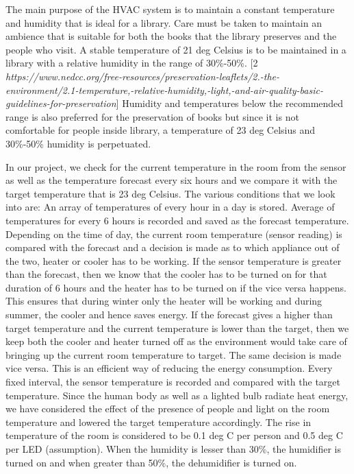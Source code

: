 \documentclass[runningheads]{llncs}
\begin{document}
The main purpose of the HVAC system is to maintain a constant temperature and humidity that is ideal for a library. Care must be taken to maintain an ambience that is suitable for both the books that the library preserves and the people who visit.
A stable temperature of 21 deg Celsius is to be maintained in a library with a relative humidity in the range of 30\%-50\%. [2 \textit{https://www.nedcc.org/free-resources/preservation-leaflets/2.-the-environment/2.1-temperature,-relative-humidity,-light,-and-air-quality-basic-guidelines-for-preservation}] Humidity and temperatures below the recommended range is also preferred for the preservation of books but since it is not comfortable for people inside library, a temperature of 23 deg Celsius and 30\%-50\% humidity is perpetuated.
\vspace{2mm}
\par In our project, we check for the current temperature in the room from the sensor as well as the temperature forecast every six hours and we compare it with the target temperature that is 23 deg Celsius. The various conditions that we look into are:
An array of temperatures of every hour in a day is stored. Average of temperatures for every 6 hours is recorded and saved as the forecast temperature. Depending on the time of day, the current room temperature (sensor reading) is compared with the forecast and a decision is made as to which appliance out of the two, heater or cooler has to be working. If the sensor temperature is greater than the forecast, then we know that the cooler has to be turned on for that duration of 6 hours and the heater has to be turned on if the vice versa happens. This ensures that during winter only the heater will be working and during summer, the cooler and hence saves energy. If the forecast gives a higher than target temperature and the current temperature is lower than the target, then we keep both the cooler and heater turned off as the environment would take care of bringing up the current room temperature to target. The same decision is made vice versa. This is an efficient way of reducing the energy consumption.
Every fixed interval, the sensor temperature is recorded and compared with the target temperature. Since the human body as well as a lighted bulb radiate heat energy, we have considered the effect of the presence of people and light on the room temperature and lowered the target temperature accordingly. The rise in temperature of the room is considered to be 0.1 deg C per person and 0.5 deg C per LED (assumption). When the humidity is lesser than 30\%, the humidifier is turned on and when greater than 50\%, the dehumidifier is turned on.
\end{document}
